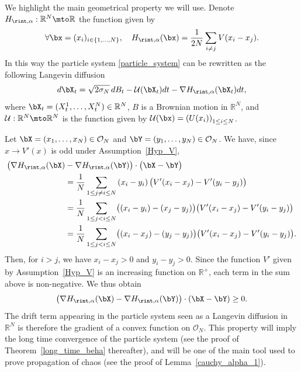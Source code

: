 \begin{remark}\label{rem:inter_conv}
We highlight the main geometrical property we will use. Denote $H_{\rint,\alpha}:\mathbb{R}^N\mto\mathbb{R}$ the function given by\vspace*{-3pt}
\begin{align*}
\forall \bx=(x_i)_{i\in\{1,\dots,N\}},\quad H_{\rint,\alpha}(\bx)=\frac{1}{2N}\sum_{i\neq j}V(x_i-x_j).
\end{align*}
In this way the particle system \eqref{particle_system} can be rewritten as the following Langevin diffusion\vspace*{-3pt}
\begin{align*}
d\bX_t=\sqrt{2\sigma_N}\,dB_t-\mathcal{U}(\bX_t)dt-\nabla H_{\rint,\alpha}(\bX_t)dt,
\end{align*}
where $\bX_t=(X^1_t,\dots,X^N_t)\in\mathbb{R}^N$, $B$ is a Brownian motion in $\mathbb{R}^N$, and $\mathcal{U}:\mathbb{R}^N\mto\mathbb{R}^N$ is the function given by $\mathcal{U}(\bx)=\left(U(x_i)\right)_{1\leq i\leq N}$.

Let $\bX=(x_1,\dots,x_N)\in\mathcal{O}_N$ and $\bY=(y_1,\dots,y_N)\in\mathcal{O}_N$. We have, since $x\to V'(x)$ is odd under Assumption~\ref{Hyp_V},\vspace*{-3pt}
\begin{align*}
\bigl(\nabla H_{\rint,\alpha}(\bX)&-\nabla H_{\rint,\alpha}(\bY)\bigr)\cdot\bigl(\bX-\bY\bigr)\\
&=\frac{1}{N}\sum_{1\leq j\neq i\leq N}\left(x_i-y_i\right)\bigl(V'(x_i-x_j)-V'(y_i-y_j)\bigr)\\
&=\frac{1}{N}\sum_{1\leq j<i\leq N}\bigl(\left(x_i-y_i\right)-\left(x_j-y_j\right)\bigr)\bigl(V'(x_i-x_j)-V'(y_i-y_j)\bigr)\\
&=\frac{1}{N}\sum_{1\leq j<i\leq N}\bigl(\left(x_i-x_j\right)-\left(y_j-y_j\right)\bigr)\bigl(V'(x_i-x_j)-V'(y_i-y_j)\bigr).
\end{align*}
Then, for $i>j$, we have $x_i-x_j>0$ and $y_i-y_j>0$. Since the function $V'$ given by Assumption~\ref{Hyp_V} is an increasing function on $\mathbb{R}^+$, each term in the sum above is non-negative. We thus obtain
\begin{align*}
\bigl(\nabla H_{\rint,\alpha}(\bX)-\nabla H_{\rint,\alpha}(\bY)\bigr)\cdot\left(\bX-\bY\right)\geq0.
\end{align*}
The drift term appearing in the particle system seen as a Langevin diffusion in $\mathbb{R}^N$ is therefore the gradient of a convex function on $\mathcal{O}_N$. This property will imply the long time convergence of the particle system (see the proof of Theorem~\ref{long_time_beha} thereafter), and will be one of the main tool used to prove propagation of chaos (see the proof of Lemma~\ref{cauchy_alpha_1}).
\end{remark}

